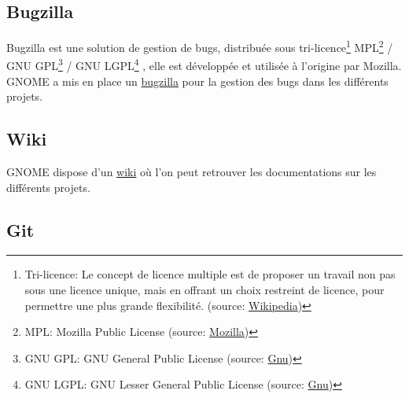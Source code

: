 \documentclass[12pt]{report}
\begin{document}
\subsection{Bugzilla}
\label{bugzilla}
Bugzilla est une solution de gestion de bugs, distribuée sous
tri-licence\footnote{Tri-licence: Le concept de licence multiple
  est de proposer un travail non pas sous une licence unique, mais
  en offrant un choix restreint de licence, pour permettre une plus
  grande flexibilité. (source:
  \href{https://fr.wikipedia.org/wiki/Licence_multiple}{Wikipedia})}
MPL\footnote{MPL: Mozilla Public License (source:
  \href{https://www.mozilla.org/en-US/MPL/}{Mozilla})}
/ GNU GPL\footnote{GNU GPL: GNU General Public License (source:
  \href{https://www.gnu.org/licenses/gpl.html}{Gnu})}
/ GNU LGPL\footnote{GNU LGPL: GNU Lesser General Public License (source:
  \href{https://www.gnu.org/licenses/lgpl.html}{Gnu})}
, elle est développée et utilisée à l'origine par Mozilla.
GNOME a mis en place un \href{https://bugzilla.gnome.org}{bugzilla} pour 
la gestion des bugs dans les différents projets.


\subsection{Wiki}
\label{wiki}
GNOME dispose d'un \href{https://wiki.gnome.org/}{wiki} où l'on peut retrouver 
les documentations sur les différents projets.

\subsection{Git}
\label{git}
\end{document}
